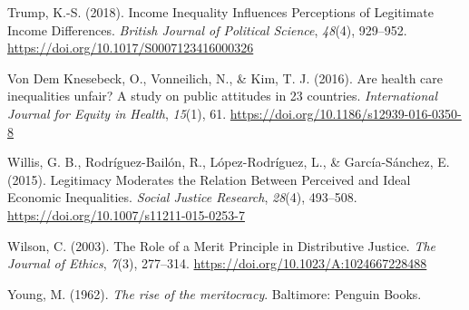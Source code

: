 \documentclass[
  12pt,
]{article}
\newlength{\cslhangindent}
\newenvironment{CSLReferences}[2] %
 {\begin{list}{}{%
  \setlength{\itemindent}{0pt}
  \setlength{\leftmargin}{0pt}
  \setlength{\parsep}{0pt}
  \ifodd #1
   \setlength{\leftmargin}{\cslhangindent}
   \setlength{\itemindent}{-1\cslhangindent}
  \fi
  \setlength{\itemsep}{#2\baselineskip}}}
 {\end{list}}
\begin{document}
\begin{CSLReferences}{1}{0}
Trump, K.-S. (2018). Income {Inequality Influences Perceptions} of
{Legitimate Income Differences}. \emph{British Journal of Political
Science}, \emph{48}(4), 929--952.
\url{https://doi.org/10.1017/S0007123416000326}

Von Dem Knesebeck, O., Vonneilich, N., \& Kim, T. J. (2016). Are health
care inequalities unfair? {A} study on public attitudes in 23 countries.
\emph{International Journal for Equity in Health}, \emph{15}(1), 61.
\url{https://doi.org/10.1186/s12939-016-0350-8}

Willis, G. B., Rodríguez-Bailón, R., López-Rodríguez, L., \&
García-Sánchez, E. (2015). Legitimacy {Moderates} the {Relation Between
Perceived} and {Ideal Economic Inequalities}. \emph{Social Justice
Research}, \emph{28}(4), 493--508.
\url{https://doi.org/10.1007/s11211-015-0253-7}

Wilson, C. (2003). The {Role} of a {Merit Principle} in {Distributive
Justice}. \emph{The Journal of Ethics}, \emph{7}(3), 277--314.
\url{https://doi.org/10.1023/A:1024667228488}

Young, M. (1962). \emph{The rise of the meritocracy}. Baltimore: Penguin
Books.

\end{CSLReferences}
\end{document}
